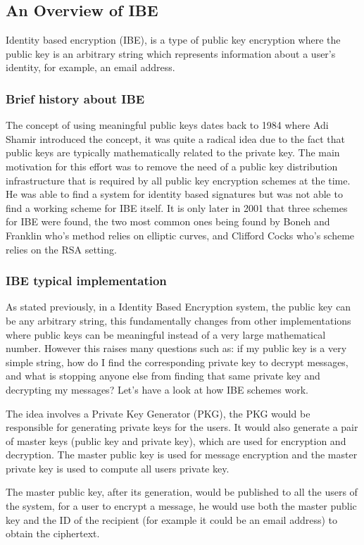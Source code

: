 \documentclass[conference]{IEEEtran}
\begin{document}
\subsection{An Overview of IBE}
Identity based encryption (IBE), is a type of public key encryption 
where the public key is an arbitrary string which represents information
about a user's identity, for example, an email address. 
\subsubsection{Brief history about IBE}
The concept of using meaningful public keys dates back to 1984 where Adi Shamir
introduced the concept, it was quite a radical idea due to the fact that 
public keys are typically mathematically related to the private key. The main 
motivation for this effort was to remove the need of a public key distribution
infrastructure that is required by all public key encryption schemes at the time.
He was able to find a system for identity based signatures but was not able to 
find a working scheme for IBE itself. It is only later in 
2001 that three schemes for IBE were found, the two most common ones being 
found by Boneh and Franklin who's method relies on elliptic curves, and 
Clifford Cocks who's scheme relies on the RSA setting.

\subsubsection{IBE typical implementation}
As stated previously, in a Identity Based Encryption system, 
the public key can be any arbitrary string, this fundamentally changes
from other implementations where public keys can be meaningful instead of 
a very large mathematical number. However this raises many questions such as: 
if my public key is a very simple string, how do I find the corresponding private
key to decrypt messages, and what is stopping anyone else from finding that same 
private key and decrypting my messages? Let's have a look at how IBE schemes work.


The idea involves a Private Key Generator (PKG), the PKG would be responsible 
for generating private keys for the users. It would also generate a pair of 
master keys (public key and private key), which are used for 
encryption and decryption. The master public key is used for message encryption and the master
private key is used to compute all users private key.


The master public key, after its generation, would be published to all the users of the system, for a user 
to encrypt a message, he would use both the master public key and the ID of the recipient
(for example it could be an email address) to obtain the ciphertext.
\end{document}
